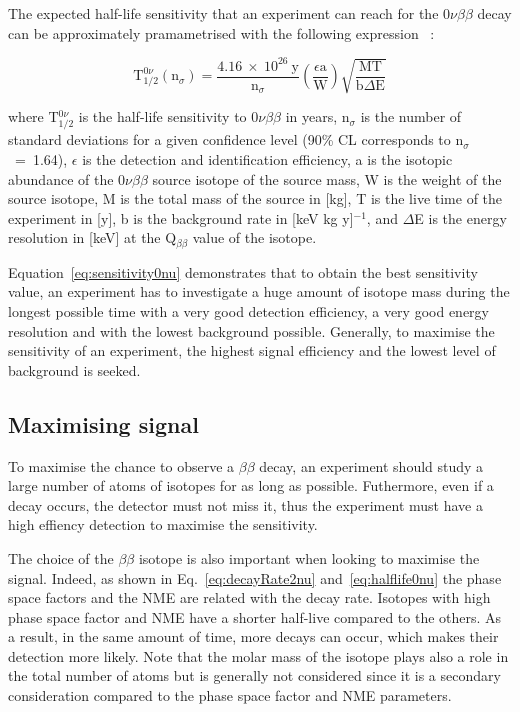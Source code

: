 \documentclass[main.tex]{subfiles}
\begin{document}
\NI The expected half-life sensitivity that an experiment can reach for the 0$\nu\beta\beta$ decay can be approximately pramametrised with the following expression~\cite{formulaSensBB} : 


\begin{equation}\label{eq:sensitivity0nu}
\text{T}_{\text{1/2}}^{0\nu} (\text{n}_\sigma) = \frac{\text{4.16}~\times~\text{10}^{\text{26}}~\text{y}}{\text{n}_\sigma} \left(\frac{\epsilon \text{a}}{\text{W}} \right) \sqrt{\frac{\text{MT}}{\text{b}\Delta\text{E}}}
\end{equation}


\bigskip


\NI where T$_{\text{1/2}}^{0\nu}$ is the half-life sensitivity to 0$\nu\beta\beta$ in years, n$_\sigma$ is the number of standard deviations for a given confidence level (90\% CL corresponds to n$_\sigma$~=~1.64), $\epsilon$ is the detection and identification efficiency, a is the isotopic abundance of the 0$\nu\beta\beta$ source isotope of the source mass, W is the weight of the source isotope, M is the total mass of the source in [kg], T is the live time of the experiment in [y], b is the background rate in [keV kg y]$^{-\text{1}}$, and $\Delta$E is the energy resolution in [keV] at the Q$_{\beta\beta}$ value of the isotope. 


\bigskip


\NI Equation~\ref{eq:sensitivity0nu} demonstrates that to obtain the best sensitivity value, an experiment has to investigate a huge amount of isotope mass during the longest possible time with a very good detection efficiency, a very good energy resolution and with the lowest background possible. Generally, to maximise the sensitivity of an experiment, the highest signal efficiency and the lowest level of background is seeked.


\subsection{Maximising signal}


\NI To maximise the chance to observe a $\beta\beta$ decay, an experiment should study a large number of atoms of isotopes for as long as possible. Futhermore, even if a decay occurs, the detector must not miss it, thus the experiment must have a high effiency detection to maximise the sensitivity.


\bigskip

\NI The choice of the $\beta\beta$ isotope is also important when looking to maximise the signal. Indeed, as shown in Eq.~\ref{eq:decayRate2nu} and~\ref{eq:halflife0nu} the phase space factors and the NME are related with the decay rate. Isotopes with high phase space factor and NME have a shorter half-live compared to the others. As a result, in the same amount of time, more decays can occur, which makes their detection more likely. Note that the molar mass of the isotope plays also a role in the total number of atoms but is generally not considered since it is a secondary consideration compared to the phase space factor and NME parameters.
\end{document}
